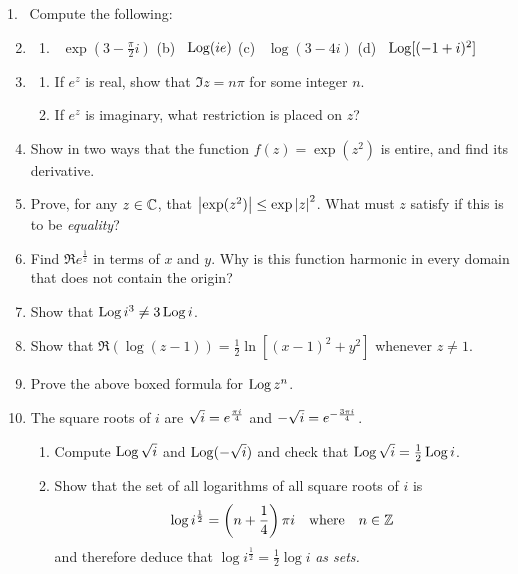 \begin{exercises*}
\hangindent\leftmargini
\textup{1.} \ Compute the following:
\begin{enumerate}\setcounter{enumi}{1}
  \item[]\begin{enumerate}
  	\item\ $\exp(3-\frac\pi 2 i)$\qquad
  	(b) \ $\operatorname{Log}(ie)$\qquad
  	(c) \ $\log(3-4i)$\qquad
  	(d) \ $\operatorname{Log}[(-1+i)^2]$
  \end{enumerate}
  
  \item\begin{enumerate}
    \item If $e^z$ is real, show that $\Im z=n\pi$ for some integer $n$.
    \item If $e^z$ is imaginary, what restriction is placed on $z$?
  \end{enumerate}
  
  \item Show in two ways that the function $f(z)=\exp(z^2)$ is entire, and find its derivative.
  
  \item Prove, for any $z\in\mathbb{C}$, that $\left| \exp(z^2)\right|\le \exp\left| z\right|^2$. What must $z$ satisfy if this is to be \emph{equality}?
  
  \item Find $\Re e^{\frac 1z}$ in terms of $x$ and $y$. Why is this function harmonic in every domain that does not contain the origin?
  
  \item Show that $\operatorname{Log} i^3\neq 3\operatorname{Log} i$.
  
  \item Show that $\Re(\log (z-1))=\frac 12\ln[(x-1)^2+y^2]$ whenever $z\neq 1$.
  
  \item Prove the above boxed formula for $\operatorname{Log} z^n$.
  
  \item The square roots of $i$ are $\sqrt i=e^{\frac{\pi i}{4}}$ and $-\sqrt i=e^{-\frac{3\pi i}{4}}$.
  \begin{enumerate}
    \item Compute $\operatorname{Log}\sqrt i$ and $\operatorname{Log}(-\sqrt i)$ and check that $\operatorname{Log}\sqrt i=\frac 12\operatorname{Log} i$.
    \item Show that the set of all logarithms of all square roots of $i$ is
    \[\log i^{\frac 12}=\left(n+\frac 14\right)\pi i\quad\text{where}\quad n\in\mathbb{Z}\]
    and therefore deduce that $\log i^{\frac 12}=\frac 12\log i$ \emph{as sets.}
	\end{enumerate}
\end{enumerate}
\end{exercises*}
\goodbreak

